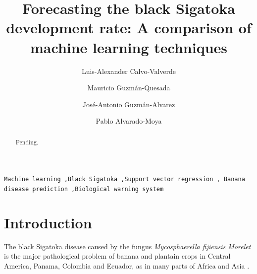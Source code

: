 \documentclass[review]{elsarticle}
\begin{document}
\begin{frontmatter}

\title{Forecasting the black Sigatoka development rate: A comparison of machine learning techniques 
}

\author[afiLuisAlex]{Luis-Alexander Calvo-Valverde}

\author[afiCorbana] {Mauricio Guzm\'an-Quesada}
\author[afiCorbana]{Jos\'e-Antonio Guzm\'an-Alvarez}
\author[afiPablo]{Pablo Alvarado-Moya}

\address[afiLuisAlex]{DOCINADE, Instituto Tecnol\'ogico de Costa Rica, 
Computer Research Center, Multidisciplinar program eScience, 
CNCA/CeNAT, Cartago, Costa Rica}

\address[afiCorbana]{Direcci\'on de Investigaciones, Corporaci\'on Bananera Nacional S.A., Gu\'apiles, Costa Rica}

\address[afiPablo]{DOCINADE, Instituto Tecnol\'ogico de Costa Rica, Cartago, Costa Rica}




\begin{abstract}
Pending.
\end{abstract}

\begin{keyword}
\texttt{Machine learning \sep Black Sigatoka \sep Support vector regression \sep
Banana disease prediction \sep Biological warning system }
\end{keyword}

\end{frontmatter}

\linenumbers

\section{Introduction}


The black Sigatoka disease caused by the fungus {\it Mycosphaerella
  fijiensis Morelet} is the major pathological problem of banana and
plantain crops in Central America, Panama, Colombia and Ecuador, as in
many parts of Africa and Asia \citep{MarinVargas1995}.
\end{document}
